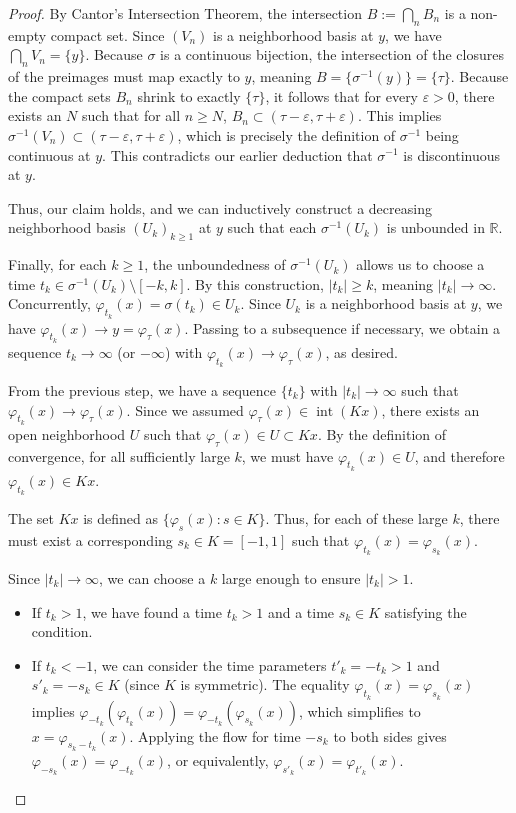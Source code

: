 \begin{proof}
    By Cantor’s Intersection Theorem, the intersection $B := \bigcap_n B_n$ is a non-empty compact set. Since $(V_n)$ is a neighborhood basis at $y$, we have $\bigcap_n V_n = \{y\}$. Because $\sigma$ is a continuous bijection, the intersection of the closures of the preimages must map exactly to $y$, meaning $B = \{\sigma^{-1}(y)\} = \{\tau\}$. Because the compact sets $B_n$ shrink to exactly $\{\tau\}$, it follows that for every $\varepsilon > 0$, there exists an $N$ such that for all $n \ge N$, $B_n \subset (\tau - \varepsilon, \tau + \varepsilon)$. This implies $\sigma^{-1}(V_n) \subset (\tau - \varepsilon, \tau + \varepsilon)$, which is precisely the definition of $\sigma^{-1}$ being continuous at $y$. This contradicts our earlier deduction that $\sigma^{-1}$ is discontinuous at $y$.

    Thus, our claim holds, and we can inductively construct a decreasing neighborhood basis $(U_k)_{k \ge 1}$ at $y$ such that each $\sigma^{-1}(U_k)$ is unbounded in $\mathbb{R}$.

    Finally, for each $k \ge 1$, the unboundedness of $\sigma^{-1}(U_k)$ allows us to choose a time $t_k \in \sigma^{-1}(U_k) \setminus [-k, k]$. By this construction, $|t_k| \ge k$, meaning $|t_k| \to \infty$. Concurrently, $\varphi_{t_k}(x) = \sigma(t_k) \in U_k$. Since $U_k$ is a neighborhood basis at $y$, we have $\varphi_{t_k}(x) \to y = \varphi_\tau(x)$. Passing to a subsequence if necessary, we obtain a sequence $t_k \to \infty$ (or $-\infty$) with $\varphi_{t_k}(x) \to \varphi_\tau(x)$, as desired.



    From the previous step, we have a sequence $\{t_k\}$ with $|t_k| \to \infty$ such that $\varphi_{t_k}(x) \to \varphi_\tau(x)$. Since we assumed $\varphi_\tau(x) \in \operatorname{int}(Kx)$, there exists an open neighborhood $U$ such that $\varphi_\tau(x) \in U \subset Kx$. By the definition of convergence, for all sufficiently large $k$, we must have $\varphi_{t_k}(x) \in U$, and therefore $\varphi_{t_k}(x) \in Kx$.

    The set $Kx$ is defined as $\{\varphi_s(x) : s \in K\}$. Thus, for each of these large $k$, there must exist a corresponding $s_k \in K = [-1, 1]$ such that $\varphi_{t_k}(x) = \varphi_{s_k}(x)$.

    Since $|t_k| \to \infty$, we can choose a $k$ large enough to ensure $|t_k| > 1$.

    \begin{itemize}
        \item  If $t_k > 1$, we have found a time $t_k > 1$ and a time $s_k \in K$ satisfying the condition.
        \item If $t_k < -1$, we can consider the time parameters $t'_k = -t_k > 1$ and $s'_k = -s_k \in K$ (since $K$ is symmetric). The equality $\varphi_{t_k}(x) = \varphi_{s_k}(x)$ implies $\varphi_{-t_k}(\varphi_{t_k}(x)) = \varphi_{-t_k}(\varphi_{s_k}(x))$, which simplifies to $x = \varphi_{s_k - t_k}(x)$. Applying the flow for time $-s_k$ to both sides gives $\varphi_{-s_k}(x) = \varphi_{-t_k}(x)$, or equivalently, $\varphi_{s'_k}(x) = \varphi_{t'_k}(x)$.
    \end{itemize}


\end{proof}
